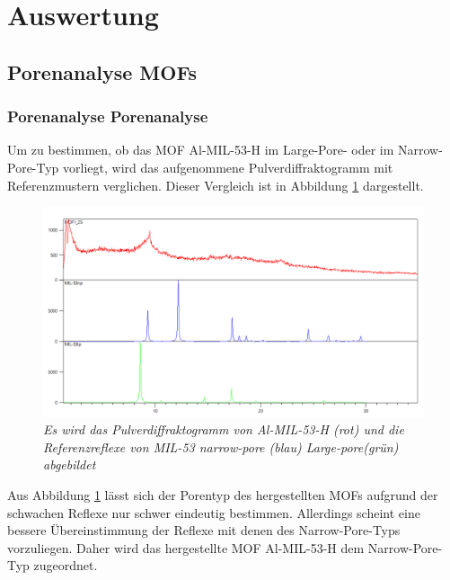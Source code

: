 \documentclass[12pt, a4paper]{article}
\begin{document}
\newpage
\section{Auswertung}
\subsection{Porenanalyse MOFs}
\subsubsection{Porenanalyse Porenanalyse}
Um zu bestimmen, ob das MOF Al-MIL-53-H im Large-Pore- oder im Narrow-Pore-Typ vorliegt, wird das aufgenommene Pulverdiffraktogramm mit Referenzmustern verglichen. 
Dieser Vergleich ist in Abbildung \ref{MOF125ver} dargestellt.
\begin{figure}[!ht]
    \includegraphics[scale=0.5]{MOF125ver.png}
    \caption{\textit{Es wird das Pulverdiffraktogramm von Al-MIL-53-H (rot) und die Referenzreflexe von MIL-53 narrow-pore (blau) Large-pore(grün) abgebildet}}
    \label{MOF125ver}
\end{figure}

\noindent
Aus Abbildung \ref{MOF125ver} lässt sich der Porentyp des hergestellten MOFs aufgrund der schwachen Reflexe nur schwer eindeutig bestimmen. 
Allerdings scheint eine bessere Übereinstimmung der Reflexe mit denen des Narrow-Pore-Typs vorzuliegen. 
Daher wird das hergestellte MOF Al-MIL-53-H dem Narrow-Pore-Typ zugeordnet.
\end{document}
